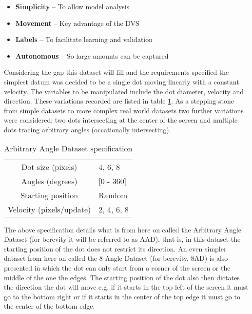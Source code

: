 \begin{itemize}
    \itemsep-0.5em
    \item \textbf{Simplicity} -- To allow model analysis 
    \item \textbf{Movement} -- Key advantage of the DVS
    \item \textbf{Labels} -- To facilitate learning and validation
    \item \textbf{Autonomous} -- So large amounts can be captured
\end{itemize}

Considering the gap this dataset will fill and the requirements specified the simplest datum was decided to be a single dot moving linearly with a constant velocity. 
The variables to be manipulated include the dot diameter, velocity and direction. 
These variations recorded are listed in table \ref{tb:datasetspecs}.
As a stepping stone from simple datasets to more complex real world datasets two further variations were considered; two dots intersecting at the center of the screen and multiple dots tracing arbitrary angles (occationally intersecting).  

\begin{table}[h]
\centering
\begin{tabular}{ | c | l | }
    \hline
    Dot size (pixels) & 4, 6, 8 \\
    Angles (degrees) & [0 - 360] \\
    Starting position & Random \\
    Velocity (pixels/update) & 2, 4, 6, 8 \\
    \hline
\end{tabular}
\caption{Arbitrary Angle Dataset specification}
\label{tb:datasetspecs}
\end{table}

The above specification details what is from here on called the Arbitrary Angle Dataset (for berevity it will be referred to as AAD), that is, in this dataset the starting position of the dot does not restrict its direction.
An even simpler dataset from here on called the 8 Angle Dataset (for berevity, 8AD) is also presented in which the dot can only start from a corner of the screen or the middle of the one the edges.
The starting position of the dot also then dictates the direction the dot will move e.g. if it starts in the top left of the screen it must go to the bottom right or if it starts in the center of the top edge it must go to the center of the bottom edge.




